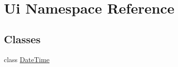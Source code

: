 \hypertarget{namespace_ui}{
\section{Ui Namespace Reference}
\label{namespace_ui}
}
\subsection*{Classes}
\begin{DoxyCompactItemize}
\item 
class \hyperlink{class_ui_1_1_date_time}{DateTime}
\end{DoxyCompactItemize}

